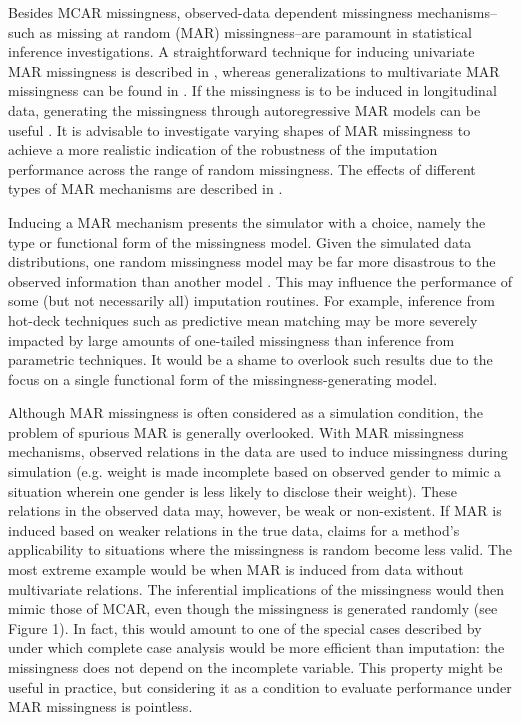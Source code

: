 \documentclass[bimj,fleqn]{w-art}
\begin{document}
Besides MCAR missingness, observed-data dependent missingness mechanisms--such as missing at random (MAR) missingness--are paramount in statistical inference investigations. A straightforward technique for inducing univariate MAR missingness is described in \citet[][\S 3.2.4]{buur18}, whereas generalizations to multivariate MAR missingness can be found in \citet{ampute}. If the missingness is to be induced in longitudinal data, generating the missingness through autoregressive MAR models can be useful \citep[see e.g.][model 2 and model 3]{shara2015randomly}. It is advisable to investigate varying shapes of MAR missingness to achieve a more realistic indication of the robustness of the imputation performance across the range of random missingness. The effects of different types of MAR mechanisms are described in \citet{scho18}. 

Inducing a MAR mechanism presents the simulator with a choice, namely the type or functional form of the missingness model. Given the simulated data distributions, one random missingness model may be far more disastrous to the observed information than another model \citep{scho18}. This may influence the performance of some (but not necessarily all) imputation routines. For example, inference from hot-deck techniques such as predictive mean matching \citep{little1988missing, rubin1986statistical} may be more severely impacted by large amounts of one-tailed missingness than inference from parametric techniques. It would be a shame to overlook such results due to the focus on a single functional form of the missingness-generating model.

Although MAR missingness is often considered as a simulation condition, the problem of spurious MAR is generally overlooked. With MAR missingness mechanisms, observed relations in the data are used to induce missingness during simulation (e.g. weight is made incomplete based on observed gender to mimic a situation wherein one gender is less likely to disclose their weight). These relations in the observed data may, however, be weak or non-existent. If MAR is induced based on weaker relations in the true data, claims for a method's applicability to situations where the missingness is random become less valid. The most extreme example would be when MAR is induced from data without multivariate relations. The inferential implications of the missingness would then mimic those of MCAR, even though the missingness is generated randomly (see Figure 1). In fact, this would amount to one of the special cases described by \citet{buur18} under which complete case analysis would be more efficient than imputation: the missingness does not depend on the incomplete variable. This property might be useful in practice, but considering it as a condition to evaluate performance under MAR missingness is pointless. 
\end{document}
